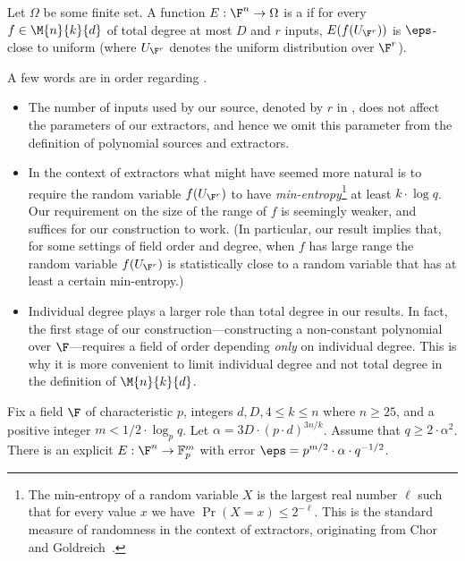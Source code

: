 %
%
\begin{definition}\label{dfn-polyext}
%
Let $\Omega$ be some finite set.
A function $E:\F^n\to \Omega$  is a \emph{} if for
every $f\in \M{n}{k}{d}$ of total degree at most $D$ and $r$ inputs,
$E(f(U_{\F^r}))$ is $\eps$-close to uniform
(where $U_{\F^r}$ denotes the uniform distribution
%
over $\F^r$).
%
%
%
%
%
\end{definition}
\begin{remark}
A few words are in order regarding .
\begin{itemize}
\item
%
%
%
 The number of inputs used by our source, denoted by $r$ in
 , does not affect the
%
%
parameters of our extractors, and hence
%
we omit this parameter from the definition of
polynomial sources and extractors.

\item In the context of extractors what might have seemed
more natural is to require the
%
%
%
%
random variable
$f(U_{\F^r})$ to have
\emph{min-entropy}\footnote{The min-entropy of a
%
%
%
random variable $X$ is
the largest %
real number $\ell$
such that for every
%
value $x$
we have %
%
%
%
$\Pr(X=x)\leq 2^{-{\ell}}$.
This is the standard measure of randomness in the context of extractors,
%
originating from Chor and Goldreich~\cite{CG88}.}
at least $k\cdot \log q$.
%
%
%
Our requirement on the size of the range of $f$ is seemingly weaker,
and suffices for our construction to work.
%
%
%
%
(In particular, our result implies that, for some settings of field order and degree, when $f$ has large range
the random variable $f(U_{\F^r})$ is statistically close to a random variable that has at least a certain min-entropy.)

\item Individual degree plays a larger role than total degree in our results.
%
  In fact, the first stage of our construction---constructing a
%
%
  non-constant polynomial over $\F$---requires a field of order
%
  depending \emph{only} on individual degree. This is why it is
  more convenient to limit individual degree and not total degree
  in the definition of $\M{n}{k}{d}$.

\end{itemize}
\end{remark}

\begin{theorem}\label{thm-ext_main_intro}
Fix a field $\F$ of characteristic $p$, integers $d,D,4\leq k\leq n$ where $n\geq 25$,
and a positive integer $m<1/2\cdot \log_p q$.
Let $\alpha=3 D \cdot (p\cdot d)^{3 n/k} $. Assume that   $q\geq 2\cdot  \alpha^2$.
There is an explicit   $E:\F^n\to \mathbb{F}_p^m$ with error
$\eps =  p^{m/2}\cdot \alpha \cdot q^{-1/2}$.
\end{theorem}

